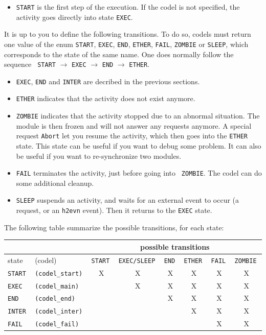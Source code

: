 \begin{itemize}
\item {\tt START} is the first step of the execution. If the codel is not
specified, the activity goes directly into state {\tt EXEC}.
\end{itemize}

It is up  to you to define the   following transitions. To  do so, codels
must return one value of  the enum {\tt  START},  {\tt EXEC}, {\tt  END},
{\tt ETHER},  {\tt FAIL}, {\tt  ZOMBIE} or {\tt SLEEP}, which corresponds
to the state of the same name. One does normally follow the sequence {\tt
START} $\rightarrow$ {\tt   EXEC} $\rightarrow$  {\tt  END} $\rightarrow$
{\tt ETHER}.

\begin{itemize}
\item {\tt EXEC}, {\tt END} and {\tt INTER} are decribed in the previous
sections.

\item {\tt ETHER} indicates that the activity does not exist anymore.

\item {\tt ZOMBIE} indicates that the activity stopped due to an abnormal
situation. The module  is then  frozen and  will not answer  any requests
anymore. A special request {\tt Abort} let you resume the activity, which
then  goes into the  {\tt ETHER} state. This  state can  be useful if you
want  to debug  some problem.  It   can also be  useful   if you want  to
re-synchronize two modules.

\item {\tt FAIL} terminates the activity, just before going into {\tt
ZOMBIE}. The codel can do some additional cleanup.

\item {\tt SLEEP} suspends an activity, and waits for an external event
to occur (a request,  or an {\tt  h2evn} event). Then  it returns  to the
{\tt EXEC} state.
\end{itemize}

The following table summarize the possible transitions, for each state:

\bigbreak

{\small\begin{tabular}{|ll||c|c|c|c|c|c|}
\cline{3-8}
\multicolumn{2}{c}{} & \multicolumn{6}{|c|}{possible transitions} \\
\hline
state & (codel) & \tt START & \tt EXEC/SLEEP & \tt END & \tt ETHER & \tt FAIL & \tt ZOMBIE \\
\hline
\tt START  & \tt (codel\_start)	& X & X & X & X & X & X \\
\tt EXEC   & \tt (codel\_main) 	&   & X & X & X & X & X \\
\tt END    & \tt (codel\_end) 	&   &   & X & X & X & X \\
\tt INTER  & \tt (codel\_inter) &   &   &   & X & X & X \\
\tt FAIL   & \tt (codel\_fail) 	&   &   &   &   & X & X \\
\hline
\end{tabular}}

